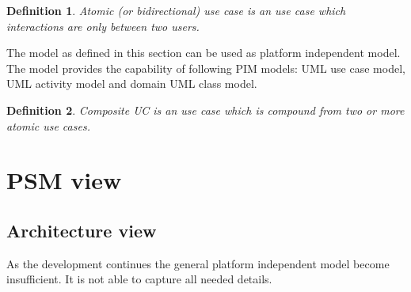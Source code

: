 \documentclass[10pt,a4paper]{article}
\newtheorem{mydef}{Definition}
\begin{document}
\begin{mydef}
Atomic (or bidirectional) use case is an use case which interactions are only between two users.
\end{mydef}

The model as defined in this section can be used as platform independent model. The model provides the capability of following PIM models: UML use case model, UML activity model and domain UML class model. 




\begin{mydef}
Composite UC is an use case which is compound from two or more atomic use cases.
\end{mydef}




\section{PSM view}

\subsection{Architecture view}
As the development continues the general platform independent model become insufficient. It is not able to capture all needed details. 


\end{document}
